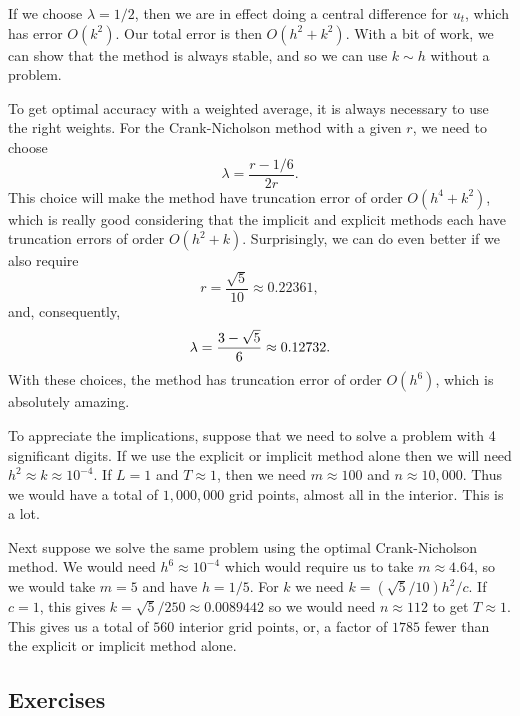 If we choose $\lambda=1/2$, then we are in effect doing a central
difference for $u_t$, which has error $O(k^2)$. Our total error is
then $O(h^2+k^2)$.  With a bit of work, we can show that the method is
always stable, and so we can use $k\sim h$ without a problem.

To get optimal accuracy with a weighted average, it is always
necessary to use the right weights. For the Crank-Nicholson
method with a given $r$, we need to choose
$$
    \lambda = \frac{r - 1/6}{2r}.
$$
This choice will make the method have truncation error of order
$O(h^4 + k^2)$, which is really good considering that the implicit and
explicit methods each have truncation errors of order $O(h^2 + k)$.
Surprisingly, we can do even better if we also require
$$
    r = \frac{\sqrt{5}}{10} \approx 0.22361,
$$
and, consequently,
$$
    \lambda = \frac{3 - \sqrt{5}}{6} \approx  0.12732.
$$
With these choices, the method has truncation error of order $O(h^6)$,
which is absolutely amazing.

To appreciate the implications, suppose that we need to solve
a problem with 4 significant digits. If we use the explicit or
implicit method alone then we will need $h^2 \approx k \approx 10^{-4}$.
If $L=1$ and $T\approx 1$, then we need
$m \approx 100$ and $n \approx 10,000$. Thus we would have a total
of $1,000,000$ grid points, almost all in the interior. This is a lot.

Next suppose we solve the same problem using the optimal
Crank-Nicholson method. We would need $h^6 \approx 10^{-4}$ which
would require us to take $m \approx 4.64$, so we would take $m = 5$
and have $h=1/5$. For $k$ we need $k = (\sqrt{5}/10) h^2/c$. If $c=1$,
this gives $k = \sqrt{5}/250\approx 0.0089442$ so we would need
$n\approx 112$ to get $T\approx 1$. This gives us a total of $560$
interior grid points, or, a factor of $1785$ fewer than the explicit or
implicit method alone.



\subsection*{Exercises}

